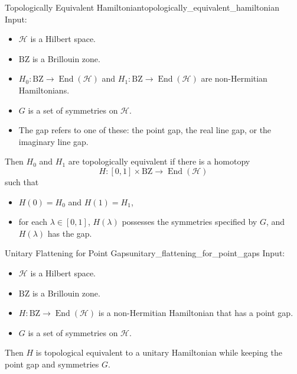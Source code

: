 \documentclass{article}
\begin{document}
\begin{definition}{Topologically Equivalent Hamiltonian}{topologically_equivalent_hamiltonian}
    Input:
    \begin{itemize}
        \item $\mathcal{H}$ is a Hilbert space.
        \item $\mathrm{BZ}$ is a Brillouin zone.
        \item $H_0: \mathrm{BZ} \rightarrow \operatorname{End}(\mathcal{H})$ and $H_1: \mathrm{BZ} \rightarrow \operatorname{End}(\mathcal{H})$ are non-Hermitian Hamiltonians.
        \item $G$ is a set of symmetries on $\mathcal{H}$.
        \item The gap refers to one of these: the point gap, the real line gap, or the imaginary line gap.
    \end{itemize}
    Then $H_0$ and $H_1$ are topologically equivalent if there is a homotopy
    \[ H: [0,1] \times \mathrm{BZ} \rightarrow \operatorname{End}(\mathcal{H}) \]
    such that
    \begin{itemize}
        \item $H(0) = H_0$ and $H(1) = H_1$,
        \item for each $\lambda\in[0,1]$, $H(\lambda)$ possesses the symmetries specified by $G$, and $H(\lambda)$ has the gap.
    \end{itemize}
\end{definition}

\begin{theorem}{Unitary Flattening for Point Gaps}{unitary_flattening_for_point_gaps}
    Input:
    \begin{itemize}
        \item $\mathcal{H}$ is a Hilbert space.
        \item $\mathrm{BZ}$ is a Brillouin zone.
        \item $H: \mathrm{BZ} \rightarrow \operatorname{End}(\mathcal{H})$ is a non-Hermitian Hamiltonian that has a point gap.
        \item $G$ is a set of symmetries on $\mathcal{H}$.
    \end{itemize}
    Then $H$ is topological equivalent to a unitary Hamiltonian while keeping the point gap and symmetries $G$.
\end{theorem}
\end{document}

